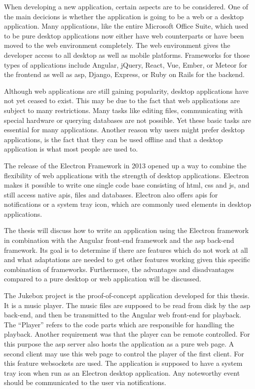
When developing a new application, certain aspects are to be considered. One of the main decicions is whether the application is going to be a web or a desktop application. Many applications, like the entire Microsoft Office Suite, which used to be pure desktop applications now either have web counterparts or have been moved to the web environment completely. The web environment gives the developer access to all desktop as well as mobile platforms. Frameworks for those types of applications include Angular, jQuery, React, Vue, Ember, or Meteor for the frontend as well as \gls{asp}, Django, Express, or Ruby on Rails for the backend.

Although web applications are still gaining popularity, desktop applications have not yet ceased to exist. This may be due to the fact that web applications are subject to many restrictions. Many tasks like editing files, communicating with special hardware or querying databases are not possible. Yet these basic tasks are essential for many applications. Another reason why users might prefer desktop applications, is the fact that they can be used offline and that a desktop application is what most people are used to.

The release of the Electron Framework in 2013 opened up a way to combine the flexibility of web applications with the strength of desktop applications. Electron makes it possible to write one single code base consisting of \gls{html}, \gls{css} and \gls{js}, and still access native \glspl{api}, files and databases. Electron also offers \glspl{api} for notifications or a system tray icon, which are commonly used elements in desktop applications.

The thesis will discuss how to write an application using the Electron framework in combination with the Angular front-end framework and the \gls{asp} back-end framework. Its goal is to determine if there are features which do not work at all and what adaptations are needed to get other features working given this specific combination of frameworks. Furthermore, the advantages and disadvantages compared to a pure desktop or web application will be discussed.


The Jukebox project is the proof-of-concept application developed for this thesis. It is a music player. The music files are supposed to be read from disk by the \gls{asp} back-end, and then be transmitted to the Angular web front-end for playback. The \enquote{Player} refers to the code parts which are responsible for handling the playback. Another requirement was that the player can be remote controlled. For this purpose the \gls{asp} server also hosts the application as a pure web page. A second client may use this web page to control the player of the first client. For this feature websockets are used. The application is supposed to have a system tray icon when run as an Electron desktop application. Any noteworthy event should be communicated to the user via notifications.


